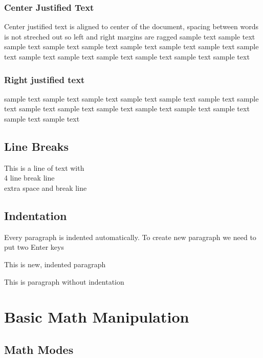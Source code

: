 \documentclass{article}
\begin{document}
\subsubsection{Center Justified Text}
\begin{center}
    Center justified text is aligned to center of the document, spacing between words is not streched out 
    so left and right margins are ragged 
    \medskip
sample text sample text sample text sample text sample text sample text sample text sample text sample text sample text sample text sample text sample text sample text sample text 
\end{center}    

\subsubsection{Right justified text}
\begin{flushright}
sample text sample text sample text sample text sample text sample text sample text sample text sample text sample text sample text sample text sample text sample text sample text 
\end{flushright}
\subsection{Line Breaks}
This is a line of text with \\ 
4 line  break line \\[4\baselineskip]
extra space and break line 
 
\subsection{Indentation}
Every paragraph is indented automatically. To create new paragraph we need to put two Enter keys

This is new, indented paragraph

\noindent This is paragraph without indentation

\section{Basic Math Manipulation}
\subsection{Math Modes  }
\end{document}
